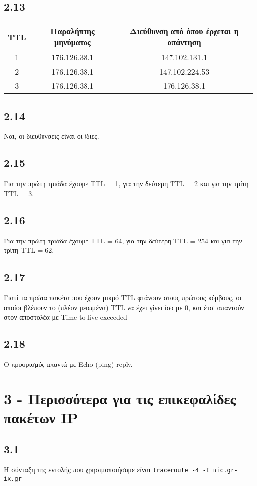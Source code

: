 		\subsection*{2.13}
			\begin{tabular}{|c|c|c|}
				\hline
				\textbf{TTL} & \textbf{Παραλήπτης μηνύματος} & \textbf{Διεύθυνση από όπου έρχεται η απάντηση} \\
				\hline
				1 & 176.126.38.1 & 147.102.131.1 \\
				\hline
				2 & 176.126.38.1 & 147.102.224.53 \\
				\hline
				3 & 176.126.38.1 & 176.126.38.1 \\
				\hline
			\end{tabular}
		
		\subsection*{2.14}
			Ναι, οι διευθύνσεις είναι οι ίδιες.
		
		\subsection*{2.15}
			Για την πρώτη τριάδα έχουμε TTL = 1, για την δεύτερη TTL = 2 και για την τρίτη TTL = 3.
		
		\subsection*{2.16}
			Για την πρώτη τριάδα έχουμε TTL = 64, για την δεύτερη TTL = 254 και για την τρίτη TTL = 62.
		
		\subsection*{2.17}
			Γιατί τα πρώτα πακέτα που έχουν μικρό TTL φτάνουν στους πρώτους κόμβους, οι οποίοι βλέπουν το (πλέον μειωμένα) TTL να έχει γίνει ίσο με 0, και έτσι απαντούν στον αποστολέα με Time-to-live exceeded. 
		
		\subsection*{2.18}	
			Ο προορισμός απαντά με Echo (ping) reply. 
	

	\section*{3 - Περισσότερα για τις επικεφαλίδες πακέτων IP}
		\subsection*{3.1}
			Η σύνταξη της εντολής που χρησιμοποιήσαμε είναι \verb|traceroute -4 -I nic.gr-ix.gr|

